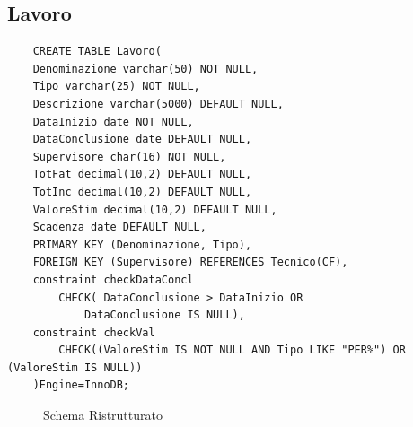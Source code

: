 \documentclass{elegantbook}
\begin{document}
\subsection{Lavoro}
\begin{verbatim}
	CREATE TABLE Lavoro(
	Denominazione varchar(50) NOT NULL,
	Tipo varchar(25) NOT NULL,
	Descrizione varchar(5000) DEFAULT NULL,
	DataInizio date NOT NULL, 
	DataConclusione date DEFAULT NULL,
	Supervisore char(16) NOT NULL,
	TotFat decimal(10,2) DEFAULT NULL,
	TotInc decimal(10,2) DEFAULT NULL,
	ValoreStim decimal(10,2) DEFAULT NULL, 
	Scadenza date DEFAULT NULL, 
	PRIMARY KEY (Denominazione, Tipo),
	FOREIGN KEY (Supervisore) REFERENCES Tecnico(CF),
	constraint checkDataConcl 
		CHECK( DataConclusione > DataInizio OR 
			DataConclusione IS NULL),
	constraint checkVal 
		CHECK((ValoreStim IS NOT NULL AND Tipo LIKE "PER%") OR (ValoreStim IS NULL))
	)Engine=InnoDB;
\end{verbatim}
\begin{figure}[H]
	\centering
	\caption{Schema Ristrutturato}
\end{figure}
\end{document}
